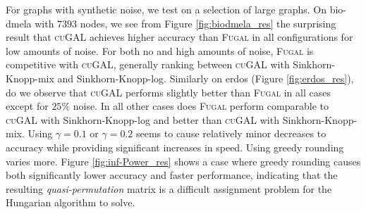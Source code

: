 

\noindent
For graphs with synthetic noise, we test on a selection of large graphs. On bio-dmela with $7 393$ nodes, we see from Figure \ref{fig:biodmela_res} the surprising result that \textsc{cuGAL} achieves higher accuracy than \textsc{Fugal} in all configurations for low amounts of noise. For both no and high amounts of noise, \textsc{Fugal} is competitive with \textsc{cuGAL}, generally ranking between \textsc{cuGAL} with Sinkhorn-Knopp-mix and Sinkhorn-Knopp-log. Similarly on erdos (Figure \ref{fig:erdos_res}), do we observe that \textsc{cuGAL} performs slightly better than \textsc{Fugal} in all cases except for $25\%$ noise. In all other cases does \textsc{Fugal} perform comparable to \textsc{cuGAL} with Sinkhorn-Knopp-log and better than \textsc{cuGAL} with Sinkhorn-Knopp-mix. Using $\gamma = 0.1$ or $\gamma = 0.2$ seems to cause relatively minor decreases to accuracy while providing significant increases in speed. Using greedy rounding varies more. Figure \ref{fig:inf-Power_res} shows a case where greedy rounding causes both significantly lower accuracy and faster performance, indicating that the resulting \textit{quasi-permutation} matrix is a difficult assignment problem for the Hungarian algorithm to solve.


\accutable
{}\timetable


